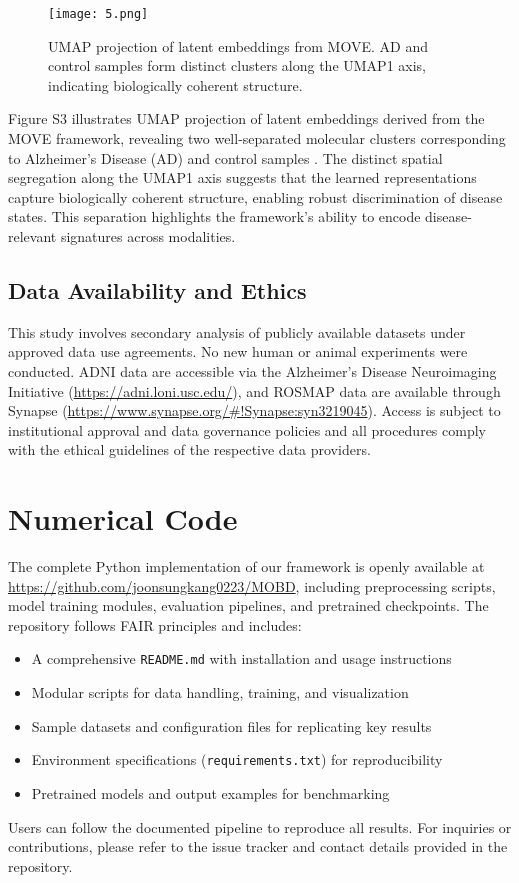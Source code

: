 \documentclass[12pt]{article}
\begin{document}
\begin{figure}[H]
\centering
\texttt{[image: 5.png]} 
\caption{UMAP projection of latent embeddings from MOVE. AD and control samples form distinct clusters along the UMAP1 axis, indicating biologically coherent structure.}
\label{fig:umap_projection}
\end{figure}
Figure S3 illustrates UMAP projection of latent embeddings derived from the MOVE framework, revealing two well-separated molecular clusters corresponding to Alzheimer's Disease (AD) and control samples \citep{mcinnes2018umap}. The distinct spatial segregation along the UMAP1 axis suggests that the learned representations capture biologically coherent structure, enabling robust discrimination of disease states. This separation highlights the framework’s ability to encode disease-relevant signatures across modalities.

\subsection*{Data Availability and Ethics}

This study involves secondary analysis of publicly available datasets under approved data use agreements. No new human or animal experiments were conducted. ADNI data are accessible via the Alzheimer's Disease Neuroimaging Initiative (\url{https://adni.loni.usc.edu/}), and ROSMAP data are available through Synapse (\url{https://www.synapse.org/#!Synapse:syn3219045}). Access is subject to institutional approval and data governance policies and all procedures comply with the ethical guidelines of the respective data providers.

\section*{Numerical Code}

The complete Python implementation of our framework is openly available at \url{https://github.com/joonsungkang0223/MOBD}, including preprocessing scripts, model training modules, evaluation pipelines, and pretrained checkpoints. The repository follows FAIR principles and includes:

\begin{itemize}
  \item A comprehensive \texttt{README.md} with installation and usage instructions
  \item Modular scripts for data handling, training, and visualization
  \item Sample datasets and configuration files for replicating key results
  \item Environment specifications (\texttt{requirements.txt}) for reproducibility
  \item Pretrained models and output examples for benchmarking
\end{itemize}

Users can follow the documented pipeline to reproduce all results. For inquiries or contributions, please refer to the issue tracker and contact details provided in the repository.


















\end{document}
